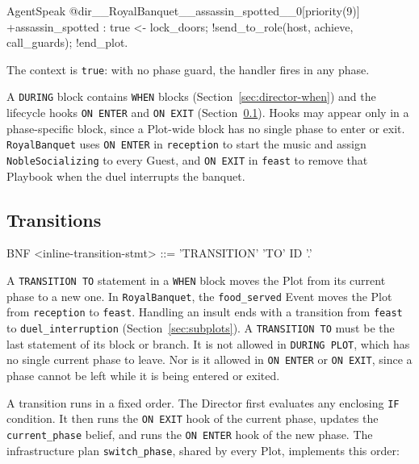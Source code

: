 \begin{codeblock}[]{AgentSpeak}
@dir__RoyalBanquet__assassin_spotted__0[priority(9)]
+assassin_spotted : true <-
    lock_doors;
    !send_to_role(host, achieve, call_guards);
    !end_plot.
\end{codeblock}
 
The context is \lstinline|true|: with no phase guard, the handler fires in any phase.
 
A \lstinline|DURING| block contains \lstinline|WHEN| blocks (Section~\ref{sec:director-when}) and the lifecycle hooks \lstinline|ON ENTER| and \lstinline|ON EXIT| (Section~\ref{sec:transitions}). Hooks may appear only in a phase-specific block, since a Plot-wide block has no single phase to enter or exit. \lstinline|RoyalBanquet| uses \lstinline|ON ENTER| in \lstinline|reception| to start the music and assign \lstinline|NobleSocializing| to every Guest, and \lstinline|ON EXIT| in \lstinline|feast| to remove that Playbook when the duel interrupts the banquet.
 
\subsection{Transitions}
\label{sec:transitions}
\begin{codeblock}[]{BNF}
    <inline-transition-stmt> ::= 'TRANSITION' 'TO' ID '.'
\end{codeblock}
 
A \lstinline|TRANSITION TO| statement in a \lstinline|WHEN| block moves the Plot from its current phase to a new one. In \lstinline|RoyalBanquet|, the \lstinline|food_served| Event moves the Plot from \lstinline|reception| to \lstinline|feast|. Handling an insult ends with a transition from \lstinline|feast| to \lstinline|duel_interruption| (Section~\ref{sec:subplots}). A \lstinline|TRANSITION TO| must be the last statement of its block or branch. It is not allowed in \lstinline|DURING PLOT|, which has no single current phase to leave. Nor is it allowed in \lstinline|ON ENTER| or \lstinline|ON EXIT|, since a phase cannot be left while it is being entered or exited.
 
A transition runs in a fixed order. The Director first evaluates any enclosing \lstinline|IF| condition. It then runs the \lstinline|ON EXIT| hook of the current phase, updates the \lstinline|current_phase| belief, and runs the \lstinline|ON ENTER| hook of the new phase. The infrastructure plan \lstinline|switch_phase|, shared by every Plot, implements this order:
 
